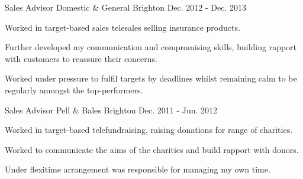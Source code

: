 \begin{cventries}
  \cventry
    {Sales Advisor}
    {Domestic \& General}
    {Brighton}
    {Dec. 2012 - Dec. 2013}
    {
      \begin{cvitems}
        \item {Worked in target-based sales telesales selling insurance products.}
        \item{Further developed my communication and compromising skills, building rapport with customers to reassure their concerns.}
        \item {Worked under pressure to fulfil targets by deadlines whilst remaining calm to be regularly amongst the top-performers.}
      \end{cvitems}
    }
  \cventry
    {Sales Advisor}
    {Pell \& Bales}
    {Brighton}
    {Dec. 2011 - Jun. 2012}
    {
      \begin{cvitems}
        \item {Worked in target-based  telefundraising, raising donations for range of charities.}
        \item{Worked to communicate the aims of the charities and build rapport with donors.}
        \item {Under flexitime arrangement was responsible for managing my own time.}
      \end{cvitems}
    }
\end{cventries}
